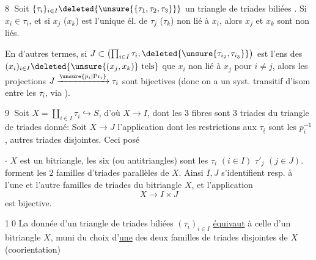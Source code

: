 \textcircled{\scriptsize 8} Soit  $\{\tau_i\}_{i\in I}\deleted{\unsure{\{\tau_1,\tau_2,\tau_3\}}}$ un triangle de triades biliées . 
 Si $x_i\in\tau_i$, et si $x_j$ ($x_k$) est l'unique él. de
$\tau_j$ ($\tau_k$) non lié à $x_i$, alors $x_j$ et $x_k$ sont non liés.

En d'autres termes, si $J\subset\bigl(\prod_{i\in I}\tau_i,\deleted{\unsure{\tau_{i_2},\tau_{i_3}}}\bigr)$ est l'ens des $(x_i)_{i\in I}\deleted{\unsure{(x_j,x_k)}\text{ tels}}$ que $x_i$ non lié à $x_j$ pour $i\ne j$,
alors les projections $J\xrightarrow{\unsure{p_i|\mathrm{Pr}_i}}\tau_i$ sont bijectives (donc on a un syst. transitif d'isom entre les $\tau_i$, via ).


\textcircled{\scriptsize 9} Soit $X=\coprod_{i\in I}\tau_i\hookrightarrow S$,  d'où $X\longrightarrow I$, dont les $3$ fibres sont    $3$ triades du triangle de triades donné:
 Soit $X\longrightarrow J$ l'application dont les restrictions aux $\tau_{\underline i}$ sont les $p_i^{-1}$,   autres triades  disjointes. Ceci posé

\textcircled{\scriptsize$\cdot$} $X$ est un bitriangle,   les six  
(ou antitriangles) sont les $\tau_i$  $(i\in I)$ $\tau'_j$ $(j\in J)$. forment les $2$ familles d'triades parallèles de $X$. Ainsi
$I,J$ s'identifient resp. à l'une et l'autre familles de triades du bitriangle $X$, et l'application
\[
 X\longrightarrow I\times J
\]
est bijective.

\textcircled{\scriptsize 10} La donnée d'un triangle de triades biliées $(\tau_i)_{i\in I}$
\uline{équivaut} à celle d'un bitriangle $X$, muni
du  choix d'\uline{une} des deux familles  de
triades  disjointes de $X$ (coorientation)
